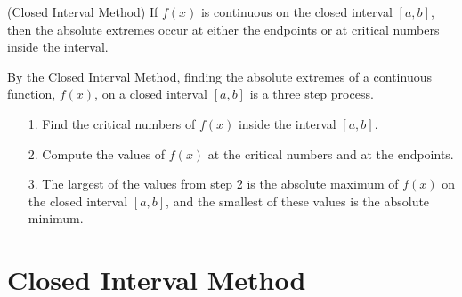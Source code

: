 \documentclass{ximera}
\begin{document}
\begin{theorem}
(Closed Interval Method)
If $f(x)$ is continuous on the closed 
interval $[a,b]$, then the absolute extremes occur at either the endpoints 
or at critical numbers inside the interval. 
\end{theorem}


By the Closed Interval Method, finding the absolute extremes of a
continuous function, $f(x)$, on a closed interval $[a,b]$ is a three 
step process.
\begin{enumerate}
\item[1.] Find the critical numbers of $f(x)$ inside the interval $[a, b]$.
\item[2.] Compute the values of $f(x)$ at the critical numbers and 
at the endpoints.
\item[3.] The largest of the values from step 2 is the absolute 
maximum of $f(x)$ on the closed interval $[a,b]$, and the smallest 
of these values is the absolute minimum.
\end{enumerate}



\section{Closed Interval Method}
\end{document}
